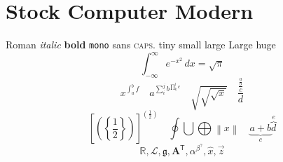 \documentclass{article}
\begin{document}
\section{Stock Computer Modern}
Roman \textit{italic} \textbf{bold} \texttt{mono} \textsf{sans} \textsc{caps}.
{\tiny tiny} {\small small} {\large large} {\Large Large} {\huge huge}
\[ \int_{-\infty}^{\infty} e^{-x^{2}}\,dx = \sqrt{\pi} \]
\[ x^{\int_{a}^{b} f} \quad a^{\sum_{i}^{j} b^{\prod_{k}^{l} c}} \quad
   \sqrt{\sqrt{\sqrt{x}}} \quad \frac{\frac{\frac{a}{b}}{c}}{d} \]
\[ \left[\left(\left\{\frac{1}{2}\right\}\right)\right]^{\left(\frac{1}{2}\right)}
   \quad \oint \bigcup \bigoplus \left\| x \right\|
   \quad \underbrace{a+b}_{c} \overbrace{d}^{e} \]
\[ \mathbb{R}, \mathcal{L}, \mathfrak{g}, \mathbf{A}^{\mathsf{T}},
   \alpha^{\beta^{\gamma}}, \hat{x}, \vec{z} \]
\end{document}
